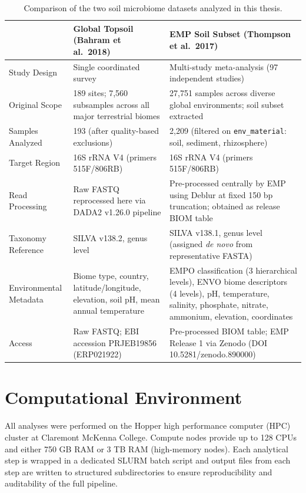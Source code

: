 \documentclass[12pt, oneside]{report}
\begin{document}
\begin{table}[H]
\centering
\caption{Comparison of the two soil microbiome datasets analyzed in this thesis.}
\label{tab:dataset-comparison}
\small
\begin{tabularx}{\textwidth}{l X X}
\toprule
& \textbf{Global Topsoil (Bahram et al.\ 2018)} & \textbf{EMP Soil Subset (Thompson et al.\ 2017)} \\
\midrule
Study Design
  & Single coordinated survey
  & Multi-study meta-analysis (97 independent studies) \\[4pt]
Original Scope
  & 189 sites; 7,560 subsamples across all major terrestrial biomes
  & 27,751 samples across diverse global environments; soil subset extracted \\[4pt]
Samples Analyzed
  & 193 (after quality-based exclusions)
  & 2,209 (filtered on \texttt{env\_material}: soil, sediment, rhizosphere) \\[4pt]
Target Region
  & 16S rRNA V4 (primers 515F/806RB)
  & 16S rRNA V4 (primers 515F/806RB) \\[4pt]
Read Processing
  & Raw FASTQ reprocessed here via DADA2 v1.26.0 pipeline
  & Pre-processed centrally by EMP using Deblur at fixed 150 bp truncation;
    obtained as release BIOM table \\[4pt]
Taxonomy Reference
  & SILVA v138.2, genus level
  & SILVA v138.1, genus level (assigned \textit{de novo} from representative FASTA) \\[4pt]
Environmental Metadata
  & Biome type, country, latitude/longitude, elevation, soil pH,
    mean annual temperature
  & EMPO classification (3 hierarchical levels), ENVO biome descriptors
    (4 levels), pH, temperature, salinity, phosphate, nitrate, ammonium,
    elevation, coordinates \\[4pt]
Access
  & Raw FASTQ; EBI accession PRJEB19856 (ERP021922)
  & Pre-processed BIOM table; EMP Release 1 via Zenodo
    (DOI 10.5281/zenodo.890000) \\
\bottomrule
\end{tabularx}
\end{table}

\section{Computational Environment}

All analyses were performed on the Hopper high performance computer (HPC) cluster at
Claremont McKenna College. Compute nodes provide up to
128 CPUs and either 750 GB RAM or 3 TB RAM (high-memory nodes). Each analytical step is
wrapped in a dedicated SLURM\cite{yoo2003} batch script and output files from each step are written to
structured subdirectories to ensure reproducibility and auditability of the full pipeline.
\end{document}
